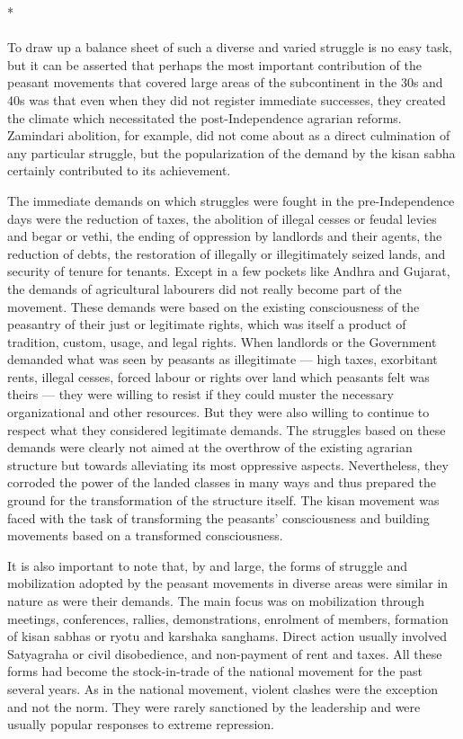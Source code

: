 \begin{center}*\end{center}

\paragraph*{}

To draw up a balance sheet of such a diverse and varied struggle is no easy task, but it can be asserted that perhaps the most important contribution of the peasant movements that covered large areas of the subcontinent in the 30s and 40s was that even when they did not register immediate successes, they created the climate which necessitated the post-Independence agrarian reforms. Zamindari abolition, for example, did not come about as a direct culmination of any particular struggle, but the popularization of the demand by the kisan sabha certainly contributed to its achievement.

The immediate demands on which struggles were fought in the pre-Independence days were the reduction of taxes, the abolition of illegal cesses or feudal levies and begar or vethi, the ending of oppression by landlords and their agents, the reduction of debts, the restoration of illegally or illegitimately seized lands, and security of tenure for tenants. Except in a few pockets like Andhra and Gujarat, the demands of agricultural labourers did not really become part of the movement. These demands were based on the existing consciousness of the peasantry of their just or legitimate rights, which was itself a product of tradition, custom, usage, and legal rights. When landlords or the Government demanded what was seen by peasants as illegitimate --- high taxes, exorbitant rents, illegal cesses, forced labour or rights over land which peasants felt was theirs --- they were willing to resist if they could muster the necessary organizational and other resources. But they were also willing to continue to respect what they considered legitimate demands. The struggles based on these demands were clearly not aimed at the overthrow of the existing agrarian structure but towards alleviating its most oppressive aspects. Nevertheless, they corroded the power of the landed classes in many ways and thus prepared the ground for the transformation of the structure itself. The kisan movement was faced with the task of transforming the peasants' consciousness and building movements based on a transformed consciousness.

It is also important to note that, by and large, the forms of struggle and mobilization adopted by the peasant movements in diverse areas were similar in nature as were their demands. The main focus was on mobilization through meetings, conferences, rallies, demonstrations, enrolment of members, formation of kisan sabhas or ryotu and karshaka sanghams. Direct action usually involved Satyagraha or civil disobedience, and non-payment of rent and taxes. All these forms had become the stock-in-trade of the national movement for the past several years. As in the national movement, violent clashes were the exception and not the norm. They were rarely sanctioned by the leadership and were usually popular responses to extreme repression.

